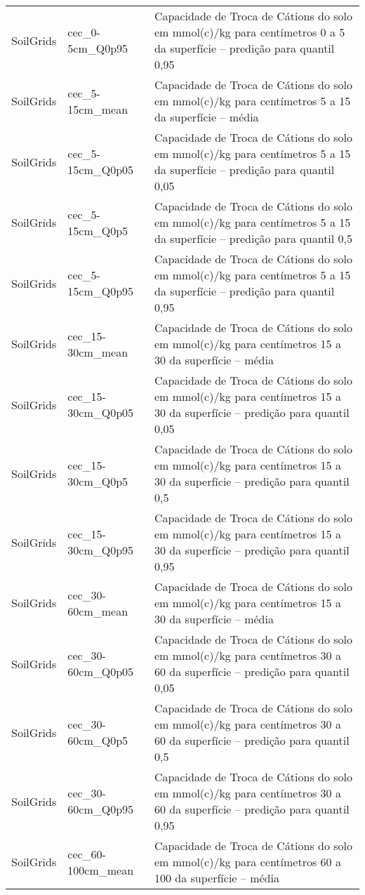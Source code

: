 \begin{longtable}{@{} p{4cm} p{4cm} p{8cm} @{}}
	SoilGrids &
	cec\_0-5cm\_Q0p95 &
	Capacidade de Troca de Cátions do solo em mmol(c)/kg para centímetros 0 a 5 da superfície – predição para quantil 0,95 \\
	SoilGrids &
	cec\_5-15cm\_mean &
	Capacidade de Troca de Cátions do solo em mmol(c)/kg para centímetros 5 a 15 da superfície – média \\
	SoilGrids &
	cec\_5-15cm\_Q0p05 &
	Capacidade de Troca de Cátions do solo em mmol(c)/kg para centímetros 5 a 15 da superfície – predição para quantil 0,05 \\
	SoilGrids &
	cec\_5-15cm\_Q0p5 &
	Capacidade de Troca de Cátions do solo em mmol(c)/kg para centímetros 5 a 15 da superfície – predição para quantil 0,5 \\
	SoilGrids &
	cec\_5-15cm\_Q0p95 &
	Capacidade de Troca de Cátions do solo em mmol(c)/kg para centímetros 5 a 15 da superfície – predição para quantil 0,95 \\
	SoilGrids &
	cec\_15-30cm\_mean &
	Capacidade de Troca de Cátions do solo em mmol(c)/kg para centímetros 15 a 30 da superfície – média \\
	SoilGrids &
	cec\_15-30cm\_Q0p05 &
	Capacidade de Troca de Cátions do solo em mmol(c)/kg para centímetros 15 a 30 da superfície – predição para quantil 0,05 \\
	SoilGrids &
	cec\_15-30cm\_Q0p5 &
	Capacidade de Troca de Cátions do solo em mmol(c)/kg para centímetros 15 a 30 da superfície – predição para quantil 0,5 \\
	SoilGrids &
	cec\_15-30cm\_Q0p95 &
	Capacidade de Troca de Cátions do solo em mmol(c)/kg para centímetros 15 a 30 da superfície – predição para quantil 0,95 \\
	SoilGrids &
	cec\_30-60cm\_mean &
	Capacidade de Troca de Cátions do solo em mmol(c)/kg para centímetros 15 a 30 da superfície – média \\
	SoilGrids &
	cec\_30-60cm\_Q0p05 &
	Capacidade de Troca de Cátions do solo em mmol(c)/kg para centímetros 30 a 60 da superfície – predição para quantil 0,05 \\
	SoilGrids &
	cec\_30-60cm\_Q0p5 &
	Capacidade de Troca de Cátions do solo em mmol(c)/kg para centímetros 30 a 60 da superfície – predição para quantil 0,5 \\
	SoilGrids &
	cec\_30-60cm\_Q0p95 &
	Capacidade de Troca de Cátions do solo em mmol(c)/kg para centímetros 30 a 60 da superfície – predição para quantil 0,95 \\
	SoilGrids &
	cec\_60-100cm\_mean &
	Capacidade de Troca de Cátions do solo em mmol(c)/kg para centímetros 60 a 100 da superfície – média \\

\end{longtable}
